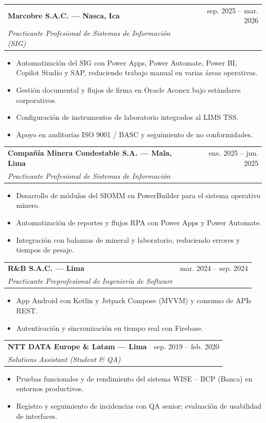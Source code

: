 \documentclass[10pt, a4paper]{article}
\makeatletter
\newcommand{\cventry}[4]{%
    \begin{tabularx}{\linewidth}{@{}Xr@{}}
        \textbf{\small #1} & {\footnotesize\textcolor{subtle}{#2}} \\[-1pt]
        {\footnotesize\textit{\textcolor{subtle}{#3}}} & \\
    \end{tabularx}
    \vspace{0pt}
    #4
    \vspace{1pt}
}
\makeatother
\begin{document}
\cventry{Marcobre S.A.C. --- Nasca, Ica}{sep. 2025 -- mar. 2026}{Practicante Profesional de Sistemas de Información (SIG)}{
    \begin{itemize}[leftmargin=1.1em, itemsep=0pt, topsep=0pt, parsep=0pt]
        \item[\textbullet] {\small Automatización del SIG con Power Apps, Power Automate, Power BI, Copilot Studio y SAP, reduciendo trabajo manual en varias áreas operativas.}
        \item[\textbullet] {\small Gestión documental y flujos de firma en Oracle Aconex bajo estándares corporativos.}
        \item[\textbullet] {\small Configuración de instrumentos de laboratorio integrados al LIMS TSS.}
        \item[\textbullet] {\small Apoyo en auditorías ISO 9001 / BASC y seguimiento de no conformidades.}
    \end{itemize}
}

\cventry{Compañía Minera Condestable S.A. --- Mala, Lima}{ene. 2025 -- jun. 2025}{Practicante Profesional de Sistemas de Información}{
    \begin{itemize}[leftmargin=1.1em, itemsep=0pt, topsep=0pt, parsep=0pt]
        \item[\textbullet] {\small Desarrollo de módulos del SIOMM en PowerBuilder para el sistema operativo minero.}
        \item[\textbullet] {\small Automatización de reportes y flujos RPA con Power Apps y Power Automate.}
        \item[\textbullet] {\small Integración con balanzas de mineral y laboratorio, reduciendo errores y tiempos de pesaje.}
    \end{itemize}
}

\cventry{R\&B S.A.C. --- Lima}{mar. 2024 -- sep. 2024}{Practicante Preprofesional de Ingeniería de Software}{
    \begin{itemize}[leftmargin=1.1em, itemsep=0pt, topsep=0pt, parsep=0pt]
        \item[\textbullet] {\small App Android con Kotlin y Jetpack Compose (MVVM) y consumo de APIs REST.}
        \item[\textbullet] {\small Autenticación y sincronización en tiempo real con Firebase.}
    \end{itemize}
}

\cventry{NTT DATA Europe \& Latam --- Lima}{sep. 2019 -- feb. 2020}{Solutions Assistant (Student \& QA)}{
    \begin{itemize}[leftmargin=1.1em, itemsep=0pt, topsep=0pt, parsep=0pt]
        \item[\textbullet] {\small Pruebas funcionales y de rendimiento del sistema WISE -- BCP (Banca) en entornos productivos.}
        \item[\textbullet] {\small Registro y seguimiento de incidencias con QA senior; evaluación de usabilidad de interfaces.}
    \end{itemize}
}
\end{document}
